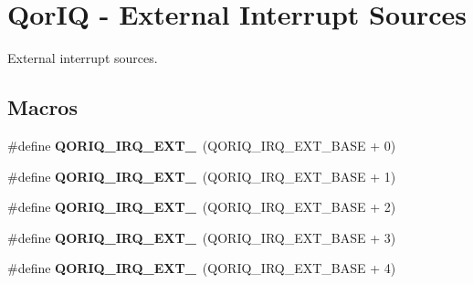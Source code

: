 \hypertarget{group__QoriqInterruptExternal}{}\section{Qor\+IQ -\/ External Interrupt Sources}
\label{group__QoriqInterruptExternal}


External interrupt sources.  


\subsection*{Macros}
\begin{DoxyCompactItemize}
\item 
\mbox{\label{group__QoriqInterruptExternal_gaf8fa3264180e87fff2f97257bf28843f}} 
\#define {\bfseries Q\+O\+R\+I\+Q\+\_\+\+I\+R\+Q\+\_\+\+E\+X\+T\+\_}~(Q\+O\+R\+I\+Q\+\_\+\+I\+R\+Q\+\_\+\+E\+X\+T\+\_\+\+B\+A\+SE + 0)
\item 
\mbox{\label{group__QoriqInterruptExternal_ga9f0ea65b911f4e279ba1e2cbd23d245f}} 
\#define {\bfseries Q\+O\+R\+I\+Q\+\_\+\+I\+R\+Q\+\_\+\+E\+X\+T\+\_}~(Q\+O\+R\+I\+Q\+\_\+\+I\+R\+Q\+\_\+\+E\+X\+T\+\_\+\+B\+A\+SE + 1)
\item 
\mbox{\label{group__QoriqInterruptExternal_gae38e1992d63104e41d218b4f9e70b88c}} 
\#define {\bfseries Q\+O\+R\+I\+Q\+\_\+\+I\+R\+Q\+\_\+\+E\+X\+T\+\_}~(Q\+O\+R\+I\+Q\+\_\+\+I\+R\+Q\+\_\+\+E\+X\+T\+\_\+\+B\+A\+SE + 2)
\item 
\mbox{\label{group__QoriqInterruptExternal_ga9ed1a5c196134425f64e9d5fff42d5ed}} 
\#define {\bfseries Q\+O\+R\+I\+Q\+\_\+\+I\+R\+Q\+\_\+\+E\+X\+T\+\_}~(Q\+O\+R\+I\+Q\+\_\+\+I\+R\+Q\+\_\+\+E\+X\+T\+\_\+\+B\+A\+SE + 3)
\item 
\mbox{\label{group__QoriqInterruptExternal_gaef1db23011fe12852d18bc97cb3fcaf1}} 
\#define {\bfseries Q\+O\+R\+I\+Q\+\_\+\+I\+R\+Q\+\_\+\+E\+X\+T\+\_}~(Q\+O\+R\+I\+Q\+\_\+\+I\+R\+Q\+\_\+\+E\+X\+T\+\_\+\+B\+A\+SE + 4)
\item 
\mbox{\label{group__QoriqInterruptExternal_ga6f1c6264059da4b4cdb99d4177203591}} 

\end{DoxyCompactItemize}
